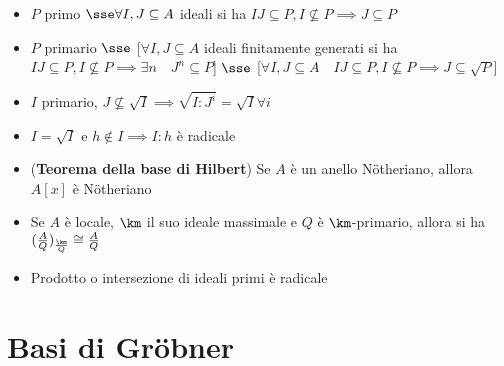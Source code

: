 \documentclass[a4paper,NoNotes,GeneralMath]{stdmdoc}
\begin{document}
\begin{itemize}
		\item $P$ primo $\sse \forall I, J \subseteq A$ ideali si ha $IJ \subseteq P, I \not\subseteq P \implies J \subseteq P$
		\item $P$ primario $\sse$ [$\forall I, J \subseteq A$ ideali finitamente generati si ha $IJ \subseteq P, I \not\subseteq P \implies \exists n \quad J^n \subseteq P$] $\sse$ [$\forall I, J \subseteq A \quad IJ \subseteq P, I \not\subseteq P \implies J \subseteq \sqrt{P}$]
		\item $I$ primario, $J \not\subseteq \sqrt{I} \implies \sqrt{I : J^i} = \sqrt{I} \forall i$
		\item $I = \sqrt{I}$ e $h \notin I \implies I:h$ è radicale
		\item ({\bf Teorema della base di Hilbert}) Se $A$ è un anello Nötheriano, allora $A[x]$ è Nötheriano
		\item Se $A$ è locale, $\km$ il suo ideale massimale e $Q$ è $\km$-primario, allora si ha $(\frac{A}{Q})_{\frac{\km}{Q}} \cong \frac{A}{Q}$
		\item Prodotto o intersezione di ideali primi è radicale
	\end{itemize}
	
	\section*{Basi di Gröbner}
\end{document}
